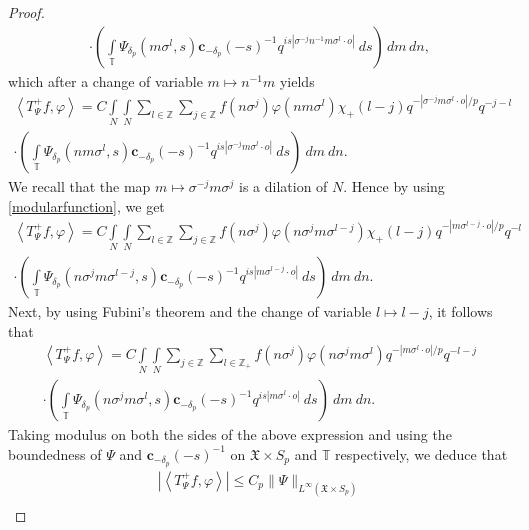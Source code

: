 \documentclass[12pt,reqno]{amsart}
\newcommand{\T}{\mathbb{T}}
\theoremstyle{definition}
\theoremstyle{definition}
\numberwithin{equation}{section}
\begin{document}
\begin{proof}
\begin{multline*}
\cdot \left(\int\limits_{\mathbb{T}}\Psi_{\delta_{p}}(m\sigma^{l},s) \mathbf{c}_{-\delta_{p}}(-s)^{-1} q^{is|\sigma^{-j}n^{-1}m\sigma^{l}\cdot o|}~ds\right) \,dm\, dn,
\end{multline*}
which after a change of variable $m\mapsto n^{-1}m$ yields
\begin{multline*}
\left\langle T_{\Psi}^{+}f, \varphi\right\rangle=C \int\limits_{N}  \int\limits_{N} \sum\limits_{l\in\mathbb{Z} } \sum\limits_{j\in\mathbb{Z} } f(n\sigma^{j})\varphi(nm\sigma^l)\chi_{+}(l-j) q^{-|\sigma^{-j}m\sigma^{l}\cdot o|/p}q^{-j-l}\\
\cdot \left(\int\limits_{\mathbb{T}}\Psi_{\delta_{p}}(nm\sigma^{l},s)\mathbf{c}_{-\delta_{p}}(-s)^{-1}q^{is|\sigma^{-j}m\sigma^{l}\cdot o|}~ds\right)~dm~dn.
\end{multline*}
We recall that the map $m\mapsto \sigma^{-j} m \sigma^j$ is a dilation of $N$. Hence by using \eqref{modularfunction}, we get
\begin{multline*}
\left\langle T_{\Psi}^{+}f, \varphi\right\rangle= C \int\limits_{N}  \int\limits_{N} \sum\limits_{l\in\mathbb{Z} } \sum\limits_{j\in\mathbb{Z} }   f(n\sigma^{j})  \varphi(n\sigma^jm \sigma^{l-j})\chi_{+}(l-j) q^{-|m \sigma^{l-j}\cdot o|/p}q^{-l}\\
\cdot \left(\int\limits_{\mathbb{T}}\Psi_{\delta_{p}}(n\sigma^j m \sigma^{l-j},s)\mathbf{c}_{-\delta_{p}}(-s)^{-1} q^{is| m \sigma^{l-j}\cdot o|}~ds\right) ~dm~dn.
\end{multline*}
Next, by using Fubini's theorem and the change of variable $ l \mapsto l-j $, it follows that    
\begin{multline*}
	\left\langle T_{\Psi}^{+}f, \varphi\right\rangle= C \int\limits_{N}  \int\limits_{N} \sum\limits_{j\in\mathbb{Z} } \sum\limits_{l\in\mathbb{Z}_+ }   f(n\sigma^{j})  \varphi(n\sigma^jm \sigma^{l}) q^{-|m \sigma^{l }\cdot o|/p}q^{-l-j}\\
	\cdot \left(\int\limits_{\mathbb{T}}\Psi_{\delta_{p}}(n\sigma^j m \sigma^{l},s)\mathbf{c}_{-\delta_{p}}(-s)^{-1} q^{is| m \sigma^{l}\cdot o|}~ds\right) ~dm~dn.
\end{multline*}
Taking modulus on both the sides of the above expression and using the boundedness of $\Psi$ and $\mathbf{c}_{-\delta_{p}}(-s)^{-1}$ on $\mathfrak{X}\times S_{p}$ and $\T$ respectively, we deduce that
\begin{multline}\label{eqn:equi_expn_of_T_psi_+_2} 
\left|	\left\langle T_{\Psi}^{+}f, \varphi\right\rangle\right|\leq C_{p} \| \Psi\|_{L^\infty(\mathfrak{X}\times S_p)} \\

\end{multline}
\end{proof}
\end{document}
